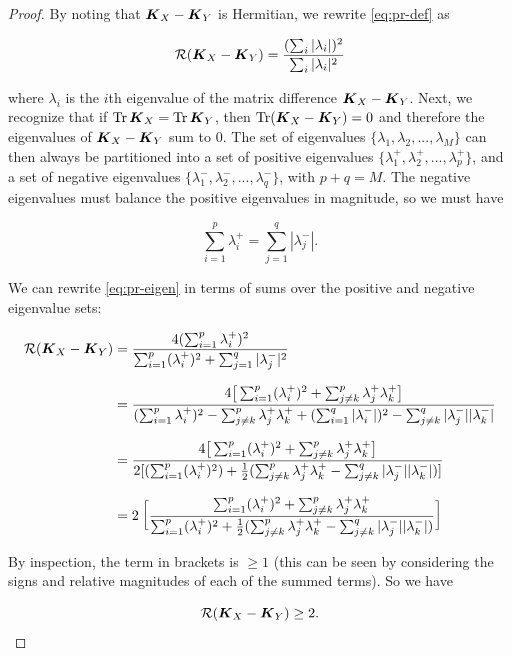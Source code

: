 \begin{proof}
By noting that $\boldsymbol{K}_X-\boldsymbol{K}_Y$ is Hermitian, we rewrite \cref{eq:pr-def} as

\begin{equation}\label{eq:pr-eigen}
    \mathcal{R}(\boldsymbol{K}_X-\boldsymbol{K}_Y) = \frac{(\sum_i |\lambda_i|)^2 }{\sum_i |\lambda_i|^2} 
\end{equation}

where $\lambda_i$ is the $i$th eigenvalue of the matrix difference $\boldsymbol{K}_X-\boldsymbol{K}_Y$.  
Next, we recognize that if $\operatorname*{Tr} \boldsymbol{K}_X = \operatorname*{Tr} \boldsymbol{K}_Y$, then $\operatorname*{Tr}(\boldsymbol{K}_X-\boldsymbol{K}_Y) = 0$ and therefore the eigenvalues of $\boldsymbol{K}_X-\boldsymbol{K}_Y$ sum to 0.  
The set of eigenvalues $\{\lambda_1, \lambda_2, ..., \lambda_M  \} $ can then always be partitioned into a set of positive eigenvalues $\{ \lambda^+_1, \lambda^+_2, ..., \lambda^+_p \}$, and a set of negative eigenvalues $\{ \lambda^-_1, \lambda^-_2, ..., \lambda^-_q \}$, with $p+q = M$.  
The negative eigenvalues must balance the positive eigenvalues in magnitude, so we  must have

\begin{equation}
    \sum_{i = 1}^p \lambda_i^+ = \sum_{j = 1}^q | \lambda_j^- |.
\end{equation}

We can rewrite \cref{eq:pr-eigen} in terms of sums over the positive and negative eigenvalue sets:

\begin{equation}
\setlength{\jot}{10pt}
\begin{split}\label{eq:big-pr-calc}
 \mathcal{R}(\mbK_X-\mbK_Y) &= \frac{4 (\sum_{i = 1}^p\lambda_i^+)^2 }{\sum_{i = 1}^p (\lambda_i^+)^2 + \sum_{j = 1}^q | \lambda_j^- |^2} \\
 &= \frac{4 \big{[}\sum_{i = 1}^p (\lambda_i^{+})^2 + \sum_{j\neq k}^p \lambda_j^+ \lambda_k^+\big{]}}{ (\sum_{i = 1}^p \lambda_i^+)^2 - \sum_{j\neq k}^p \lambda_j^+ \lambda_k^+ + (\sum_{i = 1}^q |\lambda_i^-|)^2 - \sum_{j\neq k}^q |\lambda_j^-| |\lambda_k^-|}\\
 &= \frac{4 \big{[}\sum_{i = 1}^p (\lambda_i^{+})^2 + \sum_{j\neq k}^p \lambda_j^+ \lambda_k^+\big{]}}{2[ (\sum_{i = 1}^p (\lambda_i^{+})^2) + \frac{1}{2}( \sum_{j\neq k}^p \lambda_j^+ \lambda_k^+  - \sum_{j\neq k}^q |\lambda_j^-| |\lambda_k^-|)]}\\
 &= 2\: \bigg{[} \frac{ \sum_{i = 1}^p (\lambda_i^{+})^2 + \sum_{j\neq k}^p \lambda_j^+ \lambda_k^+}{ \sum_{i = 1}^p (\lambda_i^{+} )^2 + \frac{1}{2}( \sum_{j\neq k}^p \lambda_j^+ \lambda_k^+  - \sum_{j\neq k}^q |\lambda_j^-| |\lambda_k^-|)} \bigg{]}\\
\end{split}
\end{equation}

By inspection, the term in brackets is $\ge 1$ (this can be seen by considering the signs and relative magnitudes of each of the summed terms).
So we have

\begin{equation}
    \mathcal{R}(\boldsymbol{K}_X-\boldsymbol{K}_Y) \ge 2.
\end{equation}

\end{proof}

